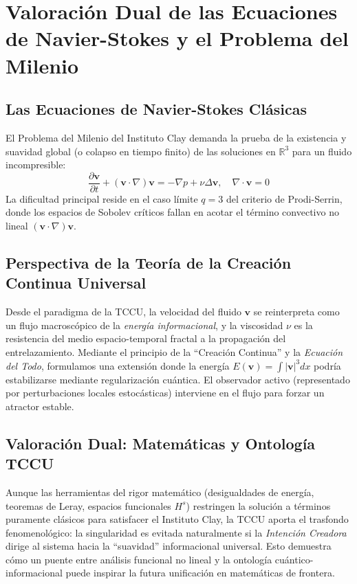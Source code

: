 \chapter{Valoración Dual de las Ecuaciones de Navier-Stokes y el Problema del Milenio}
\section{Las Ecuaciones de Navier-Stokes Clásicas}
El Problema del Milenio del Instituto Clay demanda la prueba de la existencia y suavidad global (o colapso en tiempo finito) de las soluciones en $\mathbb{R}^3$ para un fluido incompresible:
\begin{equation}
\frac{\partial \mathbf{v}}{\partial t} + (\mathbf{v} \cdot \nabla)\mathbf{v} = -\nabla p + \nu \Delta \mathbf{v}, \quad \nabla \cdot \mathbf{v} = 0
\end{equation}
La dificultad principal reside en el caso límite $q=3$ del criterio de Prodi-Serrin, donde los espacios de Sobolev críticos fallan en acotar el término convectivo no lineal $(\mathbf{v} \cdot \nabla)\mathbf{v}$.

\section{Perspectiva de la Teoría de la Creación Continua Universal}
Desde el paradigma de la TCCU, la velocidad del fluido $\mathbf{v}$ se reinterpreta como un flujo macroscópico de la \textit{energía informacional}, y la viscosidad $\nu$ es la resistencia del medio espacio-temporal fractal a la propagación del entrelazamiento.
Mediante el principio de la ``Creación Continua'' y la \textit{Ecuación del Todo}, formulamos una extensión donde la energía $E(\mathbf{v}) = \int |\mathbf{v}|^3 dx$ podría estabilizarse mediante regularización cuántica. El observador activo (representado por perturbaciones locales estocásticas) interviene en el flujo para forzar un atractor estable.

\section{Valoración Dual: Matemáticas y Ontología TCCU}
Aunque las herramientas del rigor matemático (desigualdades de energía, teoremas de Leray, espacios funcionales $H^s$) restringen la solución a términos puramente clásicos para satisfacer el Instituto Clay, la TCCU aporta el trasfondo fenomenológico: la singularidad es evitada naturalmente si la \textit{Intención Creadora} dirige al sistema hacia la ``suavidad'' informacional universal. Esto demuestra cómo un puente entre análisis funcional no lineal y la ontología cuántico-informacional puede inspirar la futura unificación en matemáticas de frontera.